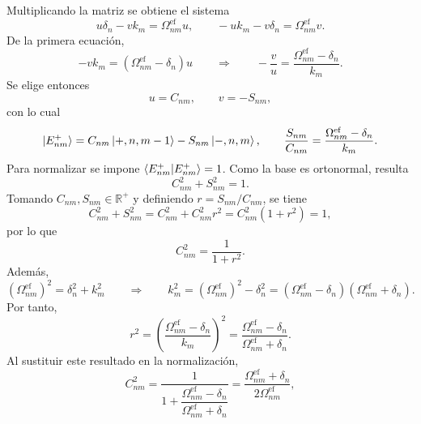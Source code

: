 \documentclass[11pt]{article}
\begin{document}
Multiplicando la matriz se obtiene el sistema
\begin{equation}
  u\delta_n-vk_m=\Omega_{nm}^{\mathrm{ef}}u,
  \qquad
  -uk_m-v\delta_n=\Omega_{nm}^{\mathrm{ef}}v.
\end{equation}
De la primera ecuaci\'on,
\begin{equation}
  -vk_m=(\Omega_{nm}^{\mathrm{ef}}-\delta_n)u
  \qquad\Rightarrow\qquad
  -\frac{v}{u}
  =
  \frac{\Omega_{nm}^{\mathrm{ef}}-\delta_n}{k_m}.
\end{equation}
Se elige entonces
\begin{equation}
  u=C_{nm},
  \qquad
  v=-S_{nm},
\end{equation}
con lo cual
\begin{equation}
  \ket{E_{nm}^{+}}
  =
  C_{nm}\ket{+,n,m-1}
  -
  S_{nm}\ket{-,n,m},
  \qquad
  \frac{S_{nm}}{C_{nm}}
  =
  \frac{\Omega_{nm}^{\mathrm{ef}}-\delta_n}{k_m}.
\end{equation}
Para normalizar se impone $\braket{E_{nm}^{+}|E_{nm}^{+}}=1$. Como la base es
ortonormal, resulta
\begin{equation}
  C_{nm}^2+S_{nm}^2=1.
\end{equation}
Tomando $C_{nm},S_{nm}\in\mathbb{R}^{+}$ y definiendo
$r=S_{nm}/C_{nm}$, se tiene
\begin{equation}
  C_{nm}^2+S_{nm}^2
  =
  C_{nm}^2+C_{nm}^2r^2
  =
  C_{nm}^2(1+r^2)
  =
  1,
\end{equation}
por lo que
\begin{equation}
  C_{nm}^2=\frac{1}{1+r^2}.
\end{equation}
Adem\'as,
\begin{equation}
  (\Omega_{nm}^{\mathrm{ef}})^2=\delta_n^2+k_m^2
  \qquad\Rightarrow\qquad
  k_m^2
  =
  (\Omega_{nm}^{\mathrm{ef}})^2-\delta_n^2
  =
  (\Omega_{nm}^{\mathrm{ef}}-\delta_n)
  (\Omega_{nm}^{\mathrm{ef}}+\delta_n).
\end{equation}
Por tanto,
\begin{equation}
  r^2
  =
  \left(
  \frac{\Omega_{nm}^{\mathrm{ef}}-\delta_n}{k_m}
  \right)^2
  =
  \frac{\Omega_{nm}^{\mathrm{ef}}-\delta_n}
  {\Omega_{nm}^{\mathrm{ef}}+\delta_n}.
\end{equation}
Al sustituir este resultado en la normalizaci\'on,
\begin{equation}
  C_{nm}^2
  =
  \frac{1}
  {1+\dfrac{\Omega_{nm}^{\mathrm{ef}}-\delta_n}
  {\Omega_{nm}^{\mathrm{ef}}+\delta_n}}
  =
  \frac{\Omega_{nm}^{\mathrm{ef}}+\delta_n}
  {2\Omega_{nm}^{\mathrm{ef}}},
\end{equation}
\end{document}
